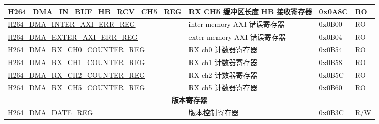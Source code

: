 \begin{longtable}{ | p{7.5cm} | p{5.7cm} | p{1.2cm} | p{1.5cm} | }
    \hyperref[regdesc:H264DMAINBUFHBRCVCH5REG]{H264\_DMA\_IN\_BUF\_HB\_RCV\_CH5\_REG} & RX CH5  缓冲区长度 HB 接收寄存器 & 0x0A8C & RO \\ \hline
    \hyperref[regdesc:H264DMAINTERAXIERRREG]{H264\_DMA\_INTER\_AXI\_ERR\_REG} & inter memory AXI 错误寄存器 & 0x0B00 & RO \\ \hline
    \hyperref[regdesc:H264DMAEXTERAXIERRREG]{H264\_DMA\_EXTER\_AXI\_ERR\_REG} & exter memory AXI 错误寄存器 & 0x0B04 & RO \\ \hline
    \hyperref[regdesc:H264DMARXCH0COUNTERREG]{H264\_DMA\_RX\_CH0\_COUNTER\_REG} & RX ch0 计数器寄存器 & 0x0B54 & RO \\ \hline
    \hyperref[regdesc:H264DMARXCH1COUNTERREG]{H264\_DMA\_RX\_CH1\_COUNTER\_REG} & RX ch1 计数器寄存器 & 0x0B58 & RO \\ \hline
    \hyperref[regdesc:H264DMARXCH2COUNTERREG]{H264\_DMA\_RX\_CH2\_COUNTER\_REG} & RX ch2 计数器寄存器 & 0x0B5C & RO \\ \hline
    \hyperref[regdesc:H264DMARXCH5COUNTERREG]{H264\_DMA\_RX\_CH5\_COUNTER\_REG} & RX ch5 计数器寄存器 & 0x0B60 & RO \\ \hline

    \multicolumn{4}{|c|}{\textbf{版本寄存器}} \\ \hline
    \hyperref[regdesc:H264DMADATEREG]{H264\_DMA\_DATE\_REG} & 版本控制寄存器 & 0x0B3C & R/W \\ \hline
    \end{longtable}
